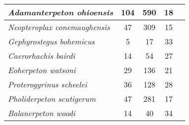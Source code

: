 \begin{tabular}{|L{4.5cm}|c|c|c|L{4.5cm}|}
\textit{Adamanterpeton ohioensis}&104&590&18&\citet{Miln98a}\\\hline
\textit{Neopteroplax conemaughensis}&47&309&15&\citet{Rome63a}\\\hline
\textit{Gephyrostegus bohemicus}&5&17&33&\citet{Brou67a}\\\hline
\textit{Caerorhachis bairdi}&14&54&27&\citet{Holm77a}\\\hline
\textit{Eoherpeton watsoni}&29&136&21&\citet{Smit85a}\\\hline
\textit{Proterogyrinus scheelei}&36&128&28&\citet{Holm84a}\\\hline
\textit{Pholiderpeton scutigerum}&47&281&17&\citet{Clac87a}\\\hline
\textit{Balanerpeton woodi}&14&40&34&\citet{Miln94a}\\\hline
\end{tabular}
